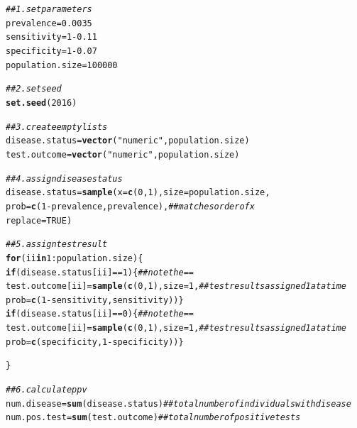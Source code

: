 \documentclass{report}\usepackage[]{graphicx}\usepackage[]{color}
\makeatletter
\newcommand{\hlnum}[1]{\textcolor[rgb]{0.686,0.059,0.569}{#1}}%
\newcommand{\hlstr}[1]{\textcolor[rgb]{0.192,0.494,0.8}{#1}}%
\newcommand{\hlcom}[1]{\textcolor[rgb]{0.678,0.584,0.686}{\textit{#1}}}%
\newcommand{\hlopt}[1]{\textcolor[rgb]{0,0,0}{#1}}%
\newcommand{\hlstd}[1]{\textcolor[rgb]{0.345,0.345,0.345}{#1}}%
\newcommand{\hlkwa}[1]{\textcolor[rgb]{0.161,0.373,0.58}{\textbf{#1}}}%
\newcommand{\hlkwb}[1]{\textcolor[rgb]{0.69,0.353,0.396}{#1}}%
\newcommand{\hlkwc}[1]{\textcolor[rgb]{0.333,0.667,0.333}{#1}}%
\newcommand{\hlkwd}[1]{\textcolor[rgb]{0.737,0.353,0.396}{\textbf{#1}}}%
\newenvironment{kframe}{%
 \def\at@end@of@kframe{}%
 \ifinner\ifhmode%
  \def\at@end@of@kframe{\end{minipage}}%
  \begin{minipage}{\columnwidth}%
 \fi\fi%
 \def\FrameCommand##1{\hskip\@totalleftmargin \hskip-\fboxsep
 \colorbox{shadecolor}{##1}\hskip-\fboxsep
     \hskip-\linewidth \hskip-\@totalleftmargin \hskip\columnwidth}%
 \MakeFramed {\advance\hsize-\width
   \@totalleftmargin\z@ \linewidth\hsize
   \@setminipage}}%
 {\par\unskip\endMakeFramed%
 \at@end@of@kframe}
\newenvironment{knitrout}{}{} %
\makeatother
\begin{document}
\begin{knitrout}
\color{fgcolor}\begin{kframe}
\begin{alltt}
\hlcom{## 1. set parameters}
\hlstd{prevalence} \hlkwb{=} \hlnum{0.0035}
\hlstd{sensitivity} \hlkwb{=} \hlnum{1} \hlopt{-} \hlnum{0.11}
\hlstd{specificity} \hlkwb{=} \hlnum{1} \hlopt{-} \hlnum{0.07}
\hlstd{population.size} \hlkwb{=} \hlnum{100000}

\hlcom{## 2. set seed}
\hlkwd{set.seed}\hlstd{(}\hlnum{2016}\hlstd{)}

\hlcom{## 3. create empty lists}
\hlstd{disease.status} \hlkwb{=} \hlkwd{vector}\hlstd{(}\hlstr{"numeric"}\hlstd{, population.size)}
\hlstd{test.outcome} \hlkwb{=} \hlkwd{vector}\hlstd{(}\hlstr{"numeric"}\hlstd{, population.size)}

\hlcom{## 4. assign disease status}
\hlstd{disease.status} \hlkwb{=} \hlkwd{sample}\hlstd{(}\hlkwc{x} \hlstd{=} \hlkwd{c}\hlstd{(}\hlnum{0}\hlstd{,}\hlnum{1}\hlstd{),} \hlkwc{size} \hlstd{= population.size,}
                        \hlkwc{prob} \hlstd{=} \hlkwd{c}\hlstd{(}\hlnum{1} \hlopt{-} \hlstd{prevalence, prevalence),}  \hlcom{## matches order of x}
                        \hlkwc{replace} \hlstd{=} \hlnum{TRUE}\hlstd{)}

\hlcom{## 5. assign test result}
\hlkwa{for} \hlstd{(ii} \hlkwa{in} \hlnum{1}\hlopt{:}\hlstd{population.size) \{}
  \hlkwa{if} \hlstd{(disease.status[ii]} \hlopt{==} \hlnum{1}\hlstd{) \{}  \hlcom{## note the ==}
    \hlstd{test.outcome[ii]} \hlkwb{=} \hlkwd{sample}\hlstd{(}\hlkwd{c}\hlstd{(}\hlnum{0}\hlstd{,} \hlnum{1}\hlstd{),} \hlkwc{size} \hlstd{=} \hlnum{1}\hlstd{,} \hlcom{## test results assigned 1 at a time}
                              \hlkwc{prob} \hlstd{=} \hlkwd{c}\hlstd{(}\hlnum{1} \hlopt{-} \hlstd{sensitivity, sensitivity))\}}
  \hlkwa{if} \hlstd{(disease.status[ii]} \hlopt{==} \hlnum{0}\hlstd{) \{}  \hlcom{## note the ==}
    \hlstd{test.outcome[ii]} \hlkwb{=} \hlkwd{sample}\hlstd{(}\hlkwd{c}\hlstd{(}\hlnum{0}\hlstd{,} \hlnum{1}\hlstd{),} \hlkwc{size} \hlstd{=} \hlnum{1}\hlstd{,} \hlcom{## test results assigned 1 at a time}
                              \hlkwc{prob} \hlstd{=} \hlkwd{c}\hlstd{(specificity,} \hlnum{1} \hlopt{-} \hlstd{specificity))\}}

\hlstd{\}}

\hlcom{## 6. calculate ppv}
\hlstd{num.disease} \hlkwb{=} \hlkwd{sum}\hlstd{(disease.status)}  \hlcom{## total number of individuals with disease}
\hlstd{num.pos.test} \hlkwb{=} \hlkwd{sum}\hlstd{(test.outcome)}   \hlcom{## total number of positive tests}


\end{alltt}
\end{kframe}
\end{knitrout}
\end{document}
